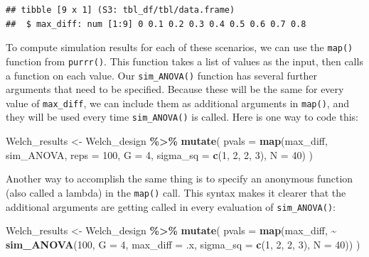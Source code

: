 \documentclass[
]{book}
\newenvironment{Shaded}{\begin{snugshade}}{\end{snugshade}}
\newcommand{\AttributeTok}[1]{\textcolor[rgb]{0.13,0.29,0.53}{#1}}
\newcommand{\DecValTok}[1]{\textcolor[rgb]{0.00,0.00,0.81}{#1}}
\newcommand{\FunctionTok}[1]{\textcolor[rgb]{0.13,0.29,0.53}{\textbf{#1}}}
\newcommand{\NormalTok}[1]{#1}
\newcommand{\OtherTok}[1]{\textcolor[rgb]{0.56,0.35,0.01}{#1}}
\newcommand{\SpecialCharTok}[1]{\textcolor[rgb]{0.81,0.36,0.00}{\textbf{#1}}}
\begin{document}
\begin{verbatim}
## tibble [9 x 1] (S3: tbl_df/tbl/data.frame)
##  $ max_diff: num [1:9] 0 0.1 0.2 0.3 0.4 0.5 0.6 0.7 0.8
\end{verbatim}

To compute simulation results for each of these scenarios, we can use the \texttt{map()} function from \texttt{purrr()}.
This function takes a list of values as the input, then calls a function on each value.
Our \texttt{sim\_ANOVA()} function has several further arguments that need to be specified.
Because these will be the same for every value of \texttt{max\_diff}, we can include them as additional arguments in \texttt{map()}, and they will be used every time \texttt{sim\_ANOVA()} is called.
Here is one way to code this:

\begin{Shaded}
\begin{Highlighting}[]
\NormalTok{Welch\_results }\OtherTok{\textless{}{-}} 
\NormalTok{  Welch\_design }\SpecialCharTok{\%\textgreater{}\%}
  \FunctionTok{mutate}\NormalTok{(}
    \AttributeTok{pvals =} \FunctionTok{map}\NormalTok{(max\_diff, sim\_ANOVA, }\AttributeTok{reps =} \DecValTok{100}\NormalTok{, }\AttributeTok{G =} \DecValTok{4}\NormalTok{, }
                \AttributeTok{sigma\_sq =} \FunctionTok{c}\NormalTok{(}\DecValTok{1}\NormalTok{, }\DecValTok{2}\NormalTok{, }\DecValTok{2}\NormalTok{, }\DecValTok{3}\NormalTok{), }\AttributeTok{N =} \DecValTok{40}\NormalTok{)}
\NormalTok{  )}
\end{Highlighting}
\end{Shaded}

Another way to accomplish the same thing is to specify an anonymous function (also called a lambda) in the \texttt{map()} call.
This syntax makes it clearer that the additional arguments are getting called in every evaluation of \texttt{sim\_ANOVA()}:

\begin{Shaded}
\begin{Highlighting}[]
\NormalTok{Welch\_results }\OtherTok{\textless{}{-}} 
\NormalTok{  Welch\_design }\SpecialCharTok{\%\textgreater{}\%}
  \FunctionTok{mutate}\NormalTok{(}
    \AttributeTok{pvals =} \FunctionTok{map}\NormalTok{(max\_diff, }\SpecialCharTok{\textasciitilde{}} \FunctionTok{sim\_ANOVA}\NormalTok{(}\DecValTok{100}\NormalTok{, }\AttributeTok{G =} \DecValTok{4}\NormalTok{, }\AttributeTok{max\_diff =}\NormalTok{ .x, }
                                      \AttributeTok{sigma\_sq =} \FunctionTok{c}\NormalTok{(}\DecValTok{1}\NormalTok{, }\DecValTok{2}\NormalTok{, }\DecValTok{2}\NormalTok{, }\DecValTok{3}\NormalTok{), }
                                      \AttributeTok{N =} \DecValTok{40}\NormalTok{))}
\NormalTok{  )}
\end{Highlighting}
\end{Shaded}
\end{document}
